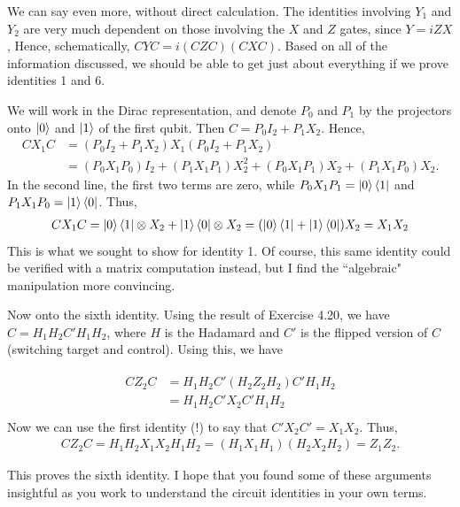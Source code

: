 \documentclass{book}
\begin{document}
    We can say even more, without direct calculation. The identities involving $Y_1$ and $Y_2$ are very much dependent on those involving the $X$ and $Z$ gates, since $Y = i ZX$, Hence, schematically, $C Y C = i(C Z C) (CXC)$. Based on all of the information discussed, we should be able to get just about everything if we prove identities 1 and 6. 

    We will work in the Dirac representation, and denote $P_0$ and $P_1$ by the projectors onto $\ket{0}$ and $\ket{1}$ of the first qubit. Then $C = P_0 I_2 + P_1 X_2$. Hence,
    \begin{align}
        C X_1 C &= (P_0 I_2 + P_1 X_2) X_1 (P_0 I_2 + P_1 X_2) \\
        &= (P_0 X_1 P_0) I_2 + (P_1 X_1 P_1) X_2^2 + (P_0 X_1 P_1) X_2 + (P_1 X_1 P_0) X_2.
    \end{align}
    In the second line, the first two terms are zero, while $P_0 X_1 P_1 = \ket{0}\bra{1}$ and $P_1 X_1 P_0 = \ket{1}\bra{0}$. Thus,
    \begin{align}
        C X_1 C = \ket{0}\bra{1} \otimes X_2 +\ket{1}\bra{0}\otimes X_2 = (\ket{0}\bra{1} + \ket{1}\bra{0}) X_2 = X_1 X_2 
    \end{align}
    This is what we sought to show for identity 1. Of course, this same identity could be verified with a matrix computation instead, but I find the ``algebraic" manipulation more convincing.

    Now onto the sixth identity. Using the result of Exercise 4.20, we have $C = H_1 H_2 C' H_1 H_2$, where $H$ is the Hadamard and $C'$ is the flipped version of $C$ (switching target and control). Using this, we have

    \begin{align}
    \begin{aligned}
        C Z_2 C &= H_1 H_2 C' (H_2 Z_2 H_2) C' H_1 H_2 \\
        &= H_1 H_2 C' X_2 C' H_1 H_2 \\
    \end{aligned}
    \end{align}
    Now we can use the first identity (!) to say that $C' X_2 C' = X_1 X_2$. Thus,
    \begin{align}
        C Z_2 C = H_1 H_2 X_1 X_2 H_1 H_2 = (H_1 X_1 H_1) (H_2 X_2 H_2) = Z_1 Z_2.
    \end{align}

    This proves the sixth identity. I hope that you found some of these arguments insightful as you work to understand the circuit identities in your own terms.
    
\end{document}
